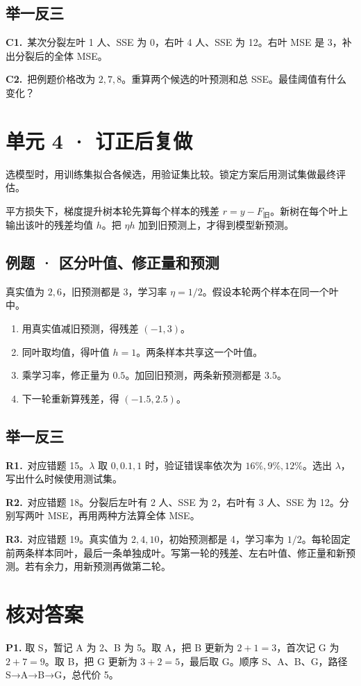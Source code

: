 \documentclass[UTF8,a4paper,11pt]{ctexart}
\newcommand{\PracticeQuestion}[3]{\par\Needspace{4\baselineskip}\noindent\begin{minipage}{\linewidth}\textbf{#1.}\ #2\par\noindent\rule{0pt}{#3mm}\par\end{minipage}\par}
\begin{document}
\subsection{举一反三}
\PracticeQuestion{C1}{某次分裂左叶 1 人、SSE 为 0，右叶 4 人、SSE 为 12。右叶 MSE 是 3，补出分裂后的全体 MSE。}{27}
\PracticeQuestion{C2}{把例题价格改为 $2,7,8$。重算两个候选的叶预测和总 SSE。最佳阈值有什么变化？}{35}
\clearpage
\section{单元 4 · 订正后复做}
选模型时，用训练集拟合各候选，用验证集比较。锁定方案后用测试集做最终评估。

平方损失下，梯度提升树本轮先算每个样本的残差 $r=y-F_{\text{旧}}$。新树在每个叶上输出该叶的残差均值 $h$。把 $\eta h$ 加到旧预测上，才得到模型新预测。

\subsection{例题 · 区分叶值、修正量和预测}
真实值为 $2,6$，旧预测都是 3，学习率 $\eta=1/2$。假设本轮两个样本在同一个叶中。

\begin{enumerate}
\item 用真实值减旧预测，得残差 $(-1,3)$。
\item 同叶取均值，得叶值 $h=1$。两条样本共享这一个叶值。
\item 乘学习率，修正量为 $0.5$。加回旧预测，两条新预测都是 $3.5$。
\item 下一轮重新算残差，得 $(-1.5,2.5)$。
\end{enumerate}
\subsection{举一反三}
\PracticeQuestion{R1}{对应错题 15。$\lambda$ 取 $0,0.1,1$ 时，验证错误率依次为 $16\%,9\%,12\%$。选出 $\lambda$，写出什么时候使用测试集。}{18}
\PracticeQuestion{R2}{对应错题 18。分裂后左叶有 2 人、SSE 为 2，右叶有 3 人、SSE 为 12。分别写两叶 MSE，再用两种方法算全体 MSE。}{26}
\PracticeQuestion{R3}{对应错题 19。真实值为 $2,4,10$，初始预测都是 4，学习率为 $1/2$。每轮固定前两条样本同叶，最后一条单独成叶。写第一轮的残差、左右叶值、修正量和新预测。若有余力，用新预测再做第二轮。}{42}
\clearpage
\section{核对答案}
\textbf{P1.} 取 S，暂记 A 为 2、B 为 5。取 A，把 B 更新为 $2+1=3$，首次记 G 为 $2+7=9$。取 B，把 G 更新为 $3+2=5$，最后取 G。顺序 S、A、B、G，路径 S→A→B→G，总代价 5。
\end{document}
